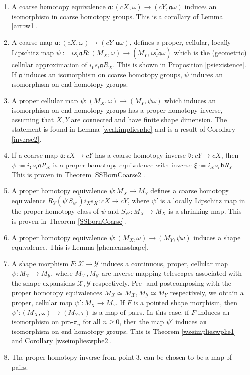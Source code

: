 \documentclass[a4paper,11pt]{article}
\theoremstyle{definition}
\theoremstyle{plain}
\theoremstyle{remark}
\begin{document}
\begin{enumerate}
\item A coarse homotopy equivalence $\mathfrak{a}:(cX,\omega)\rightarrow (cY,\mathfrak{a}\omega)$ induces an isomorphism in coarse homotopy groups. This is a corollary of Lemma \ref{arrow1}. 
\item A coarse map $\mathfrak{a}:(cX,\omega)\rightarrow (cY,\mathfrak{a}\omega)$, defines a proper, cellular, locally Lipschitz map $\psi:=\widetilde{is_{l}\mathfrak{a}R}: (M_{X},\omega)\rightarrow (M_{Y}, \widetilde{is_{l}\mathfrak{a}\omega})$ which is the (geometric) cellular approximation of $i_{Y}s_{l}\mathfrak{a}R_{X}$. This is shown in Proposition \ref{psiexistence}. If $\mathfrak{a}$ induces an isomorphism on coarse homotopy groups, $\psi$ induces an isomorphism on end homotopy groups.  
\item A proper cellular map $\psi: (M_{X}, \omega)\rightarrow (M_{Y},\psi\omega)$ which induces an isomorphism on end homotopy groups has a proper homotopy inverse, assuming that $X,Y$ are connected and have finite shape dimension. The statement is found in Lemma \ref{weakimpliesphe} and is a result of Corollary \ref{inverse2}.
\item If a coarse map $\mathfrak{a}: cX \rightarrow cY$ has a coarse homotopy inverse $\mathfrak{b}: cY\rightarrow cX$, then $\psi:=\widetilde{i_{Y}s_{l}\mathfrak{a}R_{X}}$ is a proper homotopy equivalence with inverse $\xi:= \widetilde{i_{X}s_{r}\mathfrak{b}R_{Y}}$. This is proven in Theorem \ref{SSBornCoarse2}. 
\item A proper homotopy equivalence $\psi: M_{X}\rightarrow M_{Y}$ defines a coarse homotopy equivalence $R_{Y}(\psi' S_{\psi'})i_{X}s_{X}: cX\rightarrow cY$, where $\psi'$ is a locally Lipschitz map in the proper homotopy class of $\psi$ and $S_{\psi'}: M_{X}\rightarrow M_{X}$ is a shrinking map. This is proven in Theorem \ref{SSBornCoarse}. 
\item A proper homotopy equivalence $\psi: (M_{X},\omega)\rightarrow (M_{Y},\psi \omega)$ induces a shape equivalence. This is Lemma \ref{phemeansshape}. 
\item A shape morphism $F: \mathcal{X}\rightarrow \mathcal{Y}$ induces a continuous, proper, cellular map $\psi:M_{\mathcal{X}}\rightarrow M_{\mathcal{Y}}$, where $M_{\mathcal{X}}, M_{\mathcal{Y}}$ are inverse mapping telescopes associated with the shape expansions $\mathcal{X},\mathcal{Y}$ respectively. Pre- and postcomposing with the proper homotopy equivalences $M_{X}\simeq M_{\mathcal{X}}, M_{\mathcal{Y}}\simeq M_{Y}$ respectively, we obtain a proper, cellular map $\psi': M_{X}\rightarrow M_{Y}$. If $F$ is a pointed shape morphism, then $\psi': (M_{X},\omega)\rightarrow (M_{Y},\tau)$ is a map of pairs. In this case, if $F$ induces an isomorphism on pro-$\pi_{n}$ for all $n\geq 0$, then the map $\psi'$ induces an isomorphism on end homotopy groups. This is Theorem \ref{wseimplieswphe1} and Corollary \ref{wseimplieswphe2}. 
\item The proper homotopy inverse from point $3.$ can be chosen to be a map of pairs. 
\end{enumerate}
\end{document}
